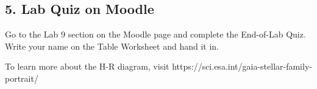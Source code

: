 \documentclass[main.tex]{subfiles}
\begin{document}
\subsection*{5. Lab Quiz on Moodle}
Go to the Lab 9 section on the Moodle page and complete the End-of-Lab Quiz. Write your name on the Table Worksheet and hand it in.

To learn more about the H-R diagram, visit https://sci.esa.int/gaia-stellar-family-portrait/
\end{document}
